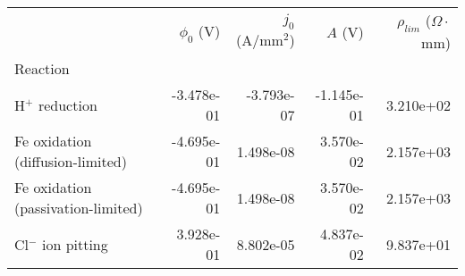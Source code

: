 \begin{tabular}{lrrrr}
\toprule
{} &  $\phi_0$ (V) &  $j_0$ (A/mm$^2$) &    $A$ (V) &  $\rho_{lim}$ ($\Omega \cdot$mm) \\
Reaction                           &               &                   &            &                                  \\
\midrule
H$^+$ reduction                    &    -3.478e-01 &        -3.793e-07 & -1.145e-01 &                        3.210e+02 \\
Fe oxidation (diffusion-limited)   &    -4.695e-01 &         1.498e-08 &  3.570e-02 &                        2.157e+03 \\
Fe oxidation (passivation-limited) &    -4.695e-01 &         1.498e-08 &  3.570e-02 &                        2.157e+03 \\
Cl$^-$ ion pitting                 &     3.928e-01 &         8.802e-05 &  4.837e-02 &                        9.837e+01 \\
\bottomrule
\end{tabular}
